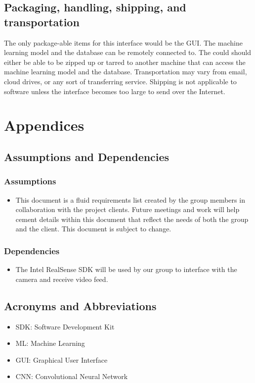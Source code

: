 \documentclass[onecolumn, draftclsnofoot,10pt, compsoc]{IEEEtran}
\begin{document}
\subsection{Packaging, handling, shipping, and transportation}
The only package-able items for this interface would be the GUI.  The machine learning model and the database can be remotely connected to.  The could should either be able to be zipped up or tarred to another machine that can access the machine learning model and the database.  Transportation may vary from email, cloud drives, or any sort of transferring service.  Shipping is not applicable to software unless the interface becomes too large to send over the Internet.

\section{Appendices}
\subsection{Assumptions and Dependencies}
\subsubsection{Assumptions}
\begin{itemize}
  \item This document is a fluid requirements list created by the group members in collaboration with the project clients. Future meetings and work will help cement details within this document that reflect the needs of both the group and the client. This document is subject to change.
\end{itemize}
\subsubsection{Dependencies}
\begin{itemize}
  \item The Intel RealSense SDK will be used by our group to interface with the camera and receive video feed\cite{third}.
\end{itemize}
\subsection{Acronyms and Abbreviations}
\begin{itemize}
  \item SDK: Software Development Kit
  \item ML: Machine Learning
  \item GUI: Graphical User Interface
  \item CNN: Convolutional Neural Network
\end{itemize}
\end{document}
